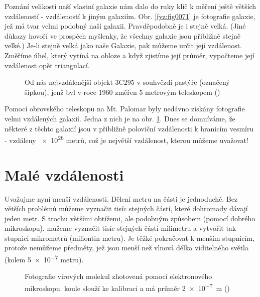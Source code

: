     Poznání velikosti naší vlastní galaxie nám dalo do ruky klíč k měření ještě větších vzdáleností 
    - vzdáleností k jiným galaxiím. Obr. \ref{fyz:fig0071} je fotografie galaxie, jež má tvar velmi 
    podobný naší galaxii. Pravděpodobně je i stejně velká. (Jiné důkazy hovoří ve prospěch 
    myšlenky, že všechny galaxie jsou přibližně stejně velké.) Je-li stejně velká jako naše 
    Galaxie, pak můžeme určit její vzdálenost. Změříme úhel, který vytíná na obloze a když zjistíme 
    její průměr, vypočteme její vzdálenost opět triangulací.

    \begin{figure}[ht!]  %
      \centering
      \caption{Od nás nejvzdálenější objekt 3C295 v souhvězdí pastýře (označený šipkou), jenž byl v 
               roce \num{1960} změřen \num{5} metrovým teleskopem (\cite[s.~73]{Feynman01})}
      \label{fyz:fig0072}
    \end{figure}
    
    Pomocí obrovského teleskopu na Mt. Palomar byly nedávno získány fotografie velmi vzdálených 
    galaxií. Jedna z nich je na obr. \ref{fyz:fig0072}. Dnes se domníváme, že některé z těchto 
    galaxií jsou v přibližně poloviční vzdálenosti k hranicím vesmíru - vzdáleny \num{e26} metrů, 
    což je největší vzdálenost, kterou můžeme uvažovat!
    
  \section{Malé vzdálenosti}
    Uvažujme nyní menší vzdálenosti. Dělení metru na části je jednoduché. Bez větších problémů 
    můžeme vyznačit tisíc stejných částí, které dohromady dávají jeden metr. S trochu většími 
    obtížemi, ale podobným způsobem (pomocí dobrého mikroskopu), můžeme vyznačit tisíc stejných 
    částí milimetru a vytvořit tak stupnici mikrometrů (miliontin metru). Je těžké pokračovat k 
    menším stupnicím, protože nemůžeme  předměty, jež jsou menší než vlnová délka 
    viditelného světla (kolem \num{5e-7} metru).

    \begin{figure}[ht!]  %
      \centering
      \caption{Fotografie virových molekul zhotovená pomocí elektronového mikroskopu.  
               koule slouží ke kalibraci a má průměr \SI{2e-7}{\m}  (\cite[s.~74]{Feynman01})}
      \label{fyz:fig0073}
    \end{figure}
    
